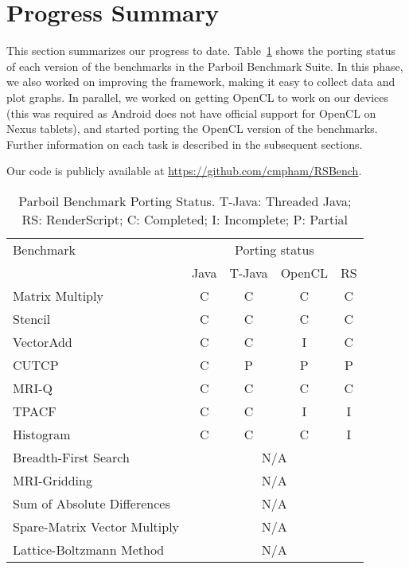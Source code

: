 \section*{Progress Summary}

This section summarizes our progress to date. Table~\ref{table:parboil} shows the
porting status of each version of the benchmarks in the Parboil Benchmark Suite.
In this phase, we also worked on improving the framework, making it easy to collect
data and plot graphs. In parallel, we worked on getting OpenCL to work on our
devices (this was required as Android does not have official support for OpenCL
on Nexus tablets), and started porting the OpenCL version of the benchmarks. 
Further information on each task is described in the subsequent sections.

Our code is publicly available at \url{https://github.com/cmpham/RSBench}.

\begin{table}[h]\small
\centering
\begin{tabular}{ | l | c | c | c | c |}
    \hline 
    Benchmark & \multicolumn{4}{|c|}{Porting status} \\ \cline{2-5}
              & Java & T-Java & OpenCL & RS \\ \hline
    Matrix Multiply & C & C & C & C \\ \hline
    Stencil & C & C & C & C \\ \hline
    VectorAdd & C & C & I & C \\ \hline
    CUTCP & C & P  & P  & P \\ \hline
    MRI-Q & C & C & C & C \\ \hline
    TPACF & C & C & I & I \\ \hline
    Histogram & C & C & C & I \\ \hline
    Breadth-First Search & \multicolumn{4}{|c|}{N/A} \\ \hline
    MRI-Gridding & \multicolumn{4}{|c|}{N/A} \\ \hline
    Sum of Absolute Differences & \multicolumn{4}{|c|}{N/A} \\ \hline
    Spare-Matrix Vector Multiply & \multicolumn{4}{|c|}{N/A} \\ \hline
    Lattice-Boltzmann Method & \multicolumn{4}{|c|}{N/A} \\ \hline
    \hline
\end{tabular}
\caption{Parboil Benchmark Porting Status. T-Java: Threaded Java; RS:
RenderScript; C: Completed; I: Incomplete; P: Partial}
\label{table:parboil}
\end{table}

